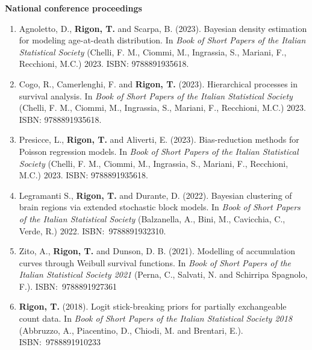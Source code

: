 \documentclass[10pt]{article}
\begin{document}
\textbf{National conference proceedings}
\begin{enumerate}
\setcounter{enumi}{\value{publications}}




\item Agnoletto, D., \textbf{Rigon, T.} and Scarpa, B. (2023). Bayesian density estimation for modeling age-at-death distribution. In \emph{Book of Short Papers of the Italian Statistical Society} (Chelli, F. M., Ciommi, M., Ingrassia, S., Mariani, F., Recchioni, M.C.) 2023. ISBN: 9788891935618. 

\item Cogo, R., Camerlenghi, F. and \textbf{Rigon, T.} (2023). Hierarchical processes in survival analysis. In \emph{Book of Short Papers of the Italian Statistical Society} (Chelli, F. M., Ciommi, M., Ingrassia, S., Mariani, F., Recchioni, M.C.) 2023. ISBN: 9788891935618. 

\item Presicce, L., \textbf{Rigon, T.} and Aliverti, E. (2023). Bias-reduction methods for Poisson regression models. In \emph{Book of Short Papers of the Italian Statistical Society} (Chelli, F. M., Ciommi, M., Ingrassia, S., Mariani, F., Recchioni, M.C.) 2023. ISBN: 9788891935618.

\item Legramanti S., \textbf{Rigon, T.} and Durante, D. (2022). Bayesian clustering of brain regions via extended stochastic block models. In \emph{Book of Short Papers of the Italian Statistical Society} (Balzanella, A., Bini, M., Cavicchia, C., Verde, R.) 2022. ISBN:~9788891932310. %

\item Zito, A., \textbf{Rigon, T.} and Dunson, D. B. (2021). Modelling of accumulation curves through Weibull survival functions. In \emph{Book of Short Papers of the Italian Statistical Society 2021} (Perna, C., Salvati, N. and Schirripa Spagnolo, F.). ISBN:~9788891927361

\item \textbf{Rigon, T.} (2018). Logit stick-breaking priors for partially exchangeable count data. In \emph{Book of Short Papers of the Italian Statistical Society 2018} (Abbruzzo, A., Piacentino, D., Chiodi, M. and Brentari, E.). ISBN:~9788891910233

\end{enumerate}

%
%
%
\end{document}
